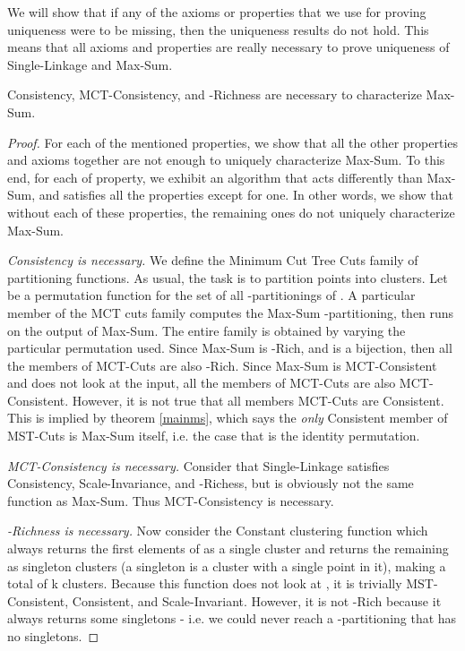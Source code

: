 \documentclass[twoside,11pt]{article}
\begin{document}
We will show that if any of the axioms or properties that we use for proving uniqueness were to be missing, then the uniqueness results do not hold. This means that all axioms and properties are really necessary to prove uniqueness of Single-Linkage and Max-Sum.
\begin{theorem} \label{noteasyms}
Consistency, MCT-Consistency, and -Richness are necessary to characterize Max-Sum.
\end{theorem}
\begin{proof}
For each of the mentioned properties, we show that all the other properties and axioms together are not enough to uniquely characterize Max-Sum. To this end, for each of  property, we exhibit an algorithm that acts differently than Max-Sum, and satisfies all the properties except for one. In other words, we show that without each of these properties, the remaining ones do not uniquely characterize Max-Sum.

\textit{Consistency is necessary.} We define the Minimum Cut Tree Cuts family of partitioning functions. As usual, the task is to partition  points into  clusters. Let  be a permutation function for the set of all -partitionings of . A particular member of the MCT cuts family computes the Max-Sum -partitioning, then runs  on the output of Max-Sum. The entire family is obtained by varying the particular permutation used. Since Max-Sum is -Rich, and  is a bijection, then all the members of MCT-Cuts are also -Rich. Since Max-Sum is MCT-Consistent and  does not look at the input, all the members of MCT-Cuts are also MCT-Consistent. However, it is not true that all members MCT-Cuts are Consistent. This is implied by theorem \ref{mainms}, which says the \textit{only} Consistent member of MST-Cuts is Max-Sum itself, i.e. the case that  is the identity permutation.

\textit{MCT-Consistency is necessary.} Consider that Single-Linkage satisfies Consistency, Scale-Invariance, and -Richess, but is obviously not the same function as Max-Sum. Thus MCT-Consistency is necessary.

\textit{-Richness is necessary.} Now consider the Constant clustering function which always returns the first  elements of  as a single cluster and returns the remaining  as singleton clusters (a singleton is a cluster with a single point in it), making a total of k clusters. Because this function does not look at , it is trivially MST-Consistent, Consistent, and Scale-Invariant. However, it is not -Rich because it always returns some singletons - i.e. we could never reach a -partitioning that has no singletons.
\end{proof}
\end{document}
